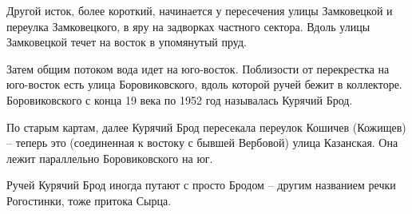 Другой исток, более короткий, начинается у пересечения улицы Замковецкой и переулка Замковецкого, в яру на задворках частного сектора. Вдоль улицы Замковецкой течет на восток в упомянутый пруд. 

Затем общим потоком вода идет на юго-вос\-ток. Поблизости от перекрестка на юго-восток есть улица Боровиковского, вдоль которой ручей бежит в коллекторе. Боровиковского с конца 19 века по 1952 год называлась Курячий Брод.

По старым картам, далее Курячий Брод пересекала переулок Кошичев (Кожищев) – теперь это (соединенная к востоку с бывшей Вербовой) улица Казанская. Она лежит параллельно Боровиковского на юг.

Ручей Курячий Брод иногда путают с просто Бродом – другим названием речки Рогостинки, тоже притока Сырца. 
